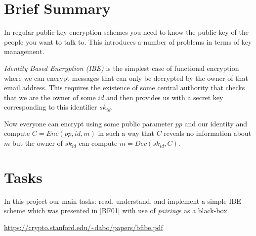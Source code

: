 \section{ Brief Summary}

In regular public-key encryption schemes you need to know the public key
of the people you want to talk to. This introduces a number of problems in terms of key management.

\textit{Identity Based Encryption (IBE)} is the simplest case of functional encryption where we can encrypt
messages that can only be decrypted by the owner of that email address. This requires the existence
of some central authority that checks that we are the owner of some $id$  and
then provides us with a secret key corresponding to this identifier $sk_{id}$.

Now everyone can encrypt using some public parameter $pp$ and our identity and compute $C = Enc(pp, id, m)$
in such a way that $C$ reveals no information about $m$ but the owner of $sk_{id}$ can compute $m = Dec(sk_{id}, C)$.

\section{Tasks}

In this project our main tasks: read, understand, and implement a simple IBE scheme which was presented
in [BF01] with use of  \textit{pairing}s as a black-box.

\url{https://crypto.stanford.edu/~dabo/papers/bfibe.pdf}

